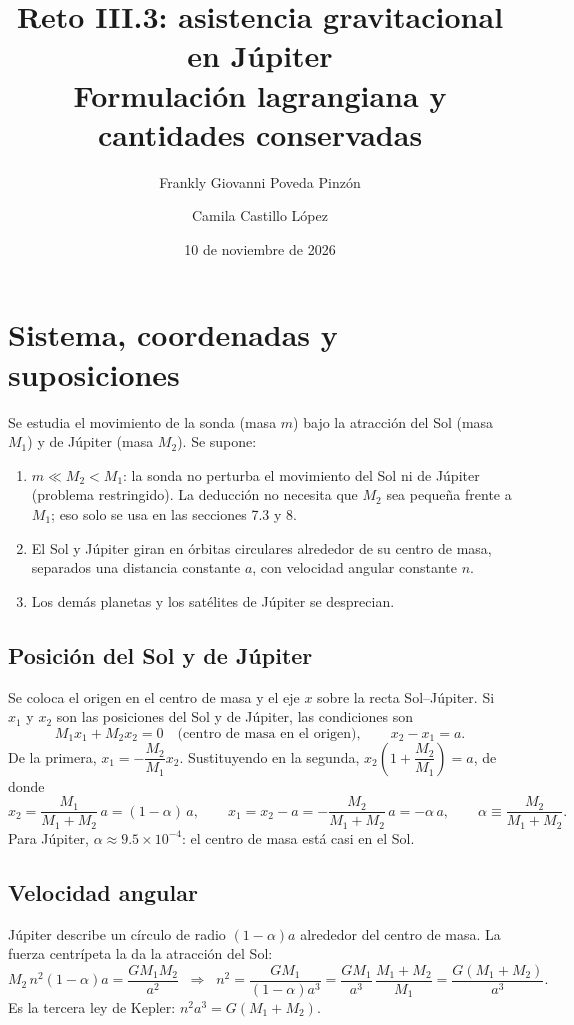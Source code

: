 \documentclass[12pt,letterpaper]{article}
\title{Reto III.3: asistencia gravitacional en Júpiter\\ Formulación lagrangiana y cantidades conservadas}
\author{Frankly Giovanni Poveda Pinzón \and Camila Castillo López}
\date{10 de noviembre de 2026}
\begin{document}
\maketitle
\thispagestyle{empty}

\section{Sistema, coordenadas y suposiciones}

Se estudia el movimiento de la sonda (masa $m$) bajo la atracción del Sol (masa $M_1$) y de
Júpiter (masa $M_2$). Se supone:
\begin{enumerate}
\item $m \ll M_2 < M_1$: la sonda no perturba el movimiento del Sol ni de Júpiter
(problema restringido). La deducción no necesita que $M_2$ sea pequeña frente a $M_1$; eso
solo se usa en las secciones 7.3 y 8.
\item El Sol y Júpiter giran en órbitas circulares alrededor de su centro de masa, separados
una distancia constante $a$, con velocidad angular constante $n$.
\item Los demás planetas y los satélites de Júpiter se desprecian.
\end{enumerate}

\subsection{Posición del Sol y de Júpiter}

Se coloca el origen en el centro de masa y el eje $x$ sobre la recta Sol--Júpiter. Si $x_1$ y
$x_2$ son las posiciones del Sol y de Júpiter, las condiciones son
\[
M_1 x_1 + M_2 x_2 = 0 \quad\text{(centro de masa en el origen)},
\qquad x_2 - x_1 = a .
\]
De la primera, $x_1 = -\dfrac{M_2}{M_1}x_2$. Sustituyendo en la segunda,
$x_2\left(1 + \dfrac{M_2}{M_1}\right) = a$, de donde
\[
x_2 = \frac{M_1}{M_1+M_2}\,a = (1-\alpha)\,a, \qquad
x_1 = x_2 - a = -\frac{M_2}{M_1+M_2}\,a = -\alpha\,a,
\qquad \alpha \equiv \frac{M_2}{M_1+M_2}.
\]
Para Júpiter, $\alpha \approx 9.5\times10^{-4}$: el centro de masa está casi en el Sol.

\subsection{Velocidad angular}

Júpiter describe un círculo de radio $(1-\alpha)a$ alrededor del centro de masa. La fuerza
centrípeta la da la atracción del Sol:
\[
M_2\, n^2 (1-\alpha) a = \frac{G M_1 M_2}{a^2}
\;\;\Longrightarrow\;\;
n^2 = \frac{G M_1}{(1-\alpha)a^3} = \frac{G M_1}{a^3}\,\frac{M_1+M_2}{M_1}
= \frac{G(M_1+M_2)}{a^3}.
\]
Es la tercera ley de Kepler: $n^2 a^3 = G(M_1+M_2)$.
\end{document}
